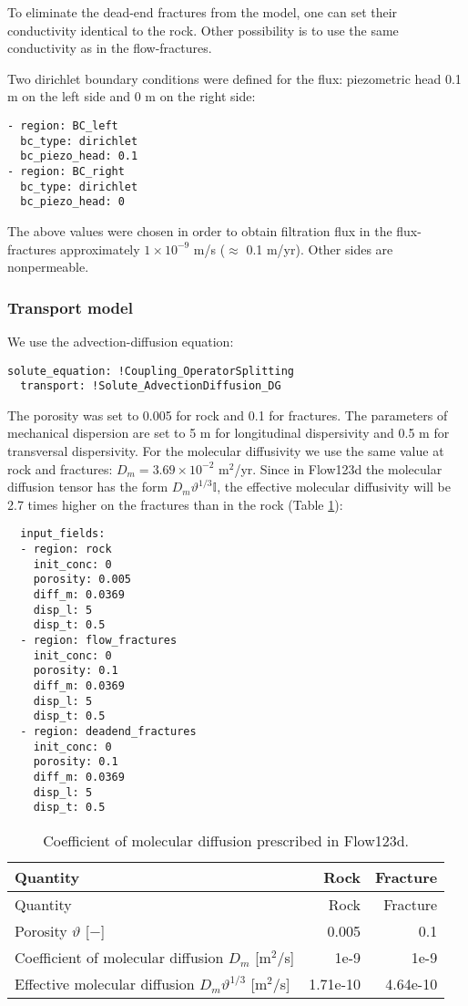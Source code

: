 To eliminate the dead-end fractures from the model, one can set their
conductivity identical to the rock. Other possibility is to use the same
conductivity as in the flow-fractures.

Two dirichlet boundary conditions were defined for the flux: piezometric
head 0.1 m on the left side and 0 m on the right side:

\begin{verbatim}
- region: BC_left
  bc_type: dirichlet
  bc_piezo_head: 0.1
- region: BC_right
  bc_type: dirichlet
  bc_piezo_head: 0
\end{verbatim}

The above values were chosen in order to obtain filtration flux in the
flux-fractures approximately \(1 \times 10^{-9}\) m/s (\(\approx\) 0.1
m/yr). Other sides are nonpermeable.

\subsubsection{Transport model}

We use the advection-diffusion equation:

\begin{verbatim}
solute_equation: !Coupling_OperatorSplitting
  transport: !Solute_AdvectionDiffusion_DG
\end{verbatim}

The porosity was set to 0.005 for rock and 0.1 for fractures. The
parameters of mechanical dispersion are set to 5 m for longitudinal
dispersivity and 0.5 m for transversal dispersivity. For the molecular
diffusivity we use the same value at rock and fractures:
\(D_m = 3.69 \times 10^{-2}\) m\(^2\)/yr. Since in Flow123d the
molecular diffusion tensor has the form \(D_m\vartheta^{1/3}\mathbb I\),
the effective molecular diffusivity will be 2.7 times higher on the
fractures than in the rock (Table \ref{tbl:coefDiff}):

\begin{verbatim}
  input_fields:
  - region: rock
    init_conc: 0
    porosity: 0.005
    diff_m: 0.0369
    disp_l: 5
    disp_t: 0.5
  - region: flow_fractures
    init_conc: 0
    porosity: 0.1
    diff_m: 0.0369
    disp_l: 5
    disp_t: 0.5
  - region: deadend_fractures
    init_conc: 0
    porosity: 0.1
    diff_m: 0.0369
    disp_l: 5
    disp_t: 0.5
\end{verbatim}

\begin{longtable}[]{@{}lrr@{}}
\caption{Coefficient of molecular diffusion prescribed in Flow123d.
\label{tbl:coefDiff}}\tabularnewline
\toprule
Quantity & Rock & Fracture\tabularnewline
\midrule
\endfirsthead
\toprule
Quantity & Rock & Fracture\tabularnewline
\midrule
\endhead
Porosity \(\vartheta\) {[}\(-\){]} & 0.005 & 0.1\tabularnewline
Coefficient of molecular diffusion \(D_m\) {[}m\(^2\)/s{]} & 1e-9 &
1e-9\tabularnewline
Effective molecular diffusion \(D_m\vartheta^{1/3}\) {[}m\(^2\)/s{]} &
1.71e-10 & 4.64e-10\tabularnewline
\bottomrule
\end{longtable}

